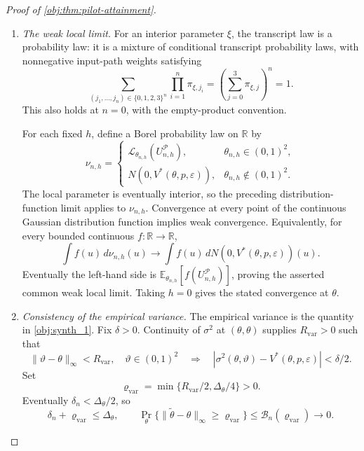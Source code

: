 \begin{proof}[Proof of \cref{obj:thm:pilot-attainment}]
\begin{enumerate}
Both distribution functions lie in \([0,1]\). Splitting the pilot average into the displayed neighborhood and its complement therefore gives, eventually,
\[
\left|
\sum_{\mathbf r}w_{n,h}(\mathbf r)
\mathcal C_{n,h}(x;\vartheta_n(\mathbf r))
-\mathcal G_\theta(x)
\right|
\le a+\mathcal B_n(\beta_n).
\]
Letting \(n\to\infty\), then \(a\downarrow0\), proves
\[
\Pr_{\theta_{n,h}}\{U_{n,h}^{\mathcal P}\le x\}
\longrightarrow\mathcal G_\theta(x)
\qquad(h\in\mathbb R^2,\ x\in\mathbb R).
\]

\item \emph{The weak local limit.}
For an interior parameter \(\xi\), the transcript law is a probability law: it is a mixture of conditional transcript probability laws, with nonnegative input-path weights satisfying
\[
\sum_{(j_1,\ldots,j_n)\in\{0,1,2,3\}^n}
\prod_{i=1}^n\pi_{\xi,j_i}
=\left(\sum_{j=0}^3\pi_{\xi,j}\right)^n=1.
\]
This also holds at \(n=0\), with the empty-product convention.

For each fixed \(h\), define a Borel probability law on \(\mathbb R\) by
\[
\nu_{n,h}=
\begin{cases}
\mathcal L_{\theta_{n,h}}(U_{n,h}^{\mathcal P}),
&\theta_{n,h}\in(0,1)^2,\\
N(0,V^*(\theta,p,\varepsilon)),
&\theta_{n,h}\notin(0,1)^2.
\end{cases}
\]
The local parameter is eventually interior, so the preceding distribution-function limit applies to \(\nu_{n,h}\). Convergence at every point of the continuous Gaussian distribution function implies weak convergence. Equivalently, for every bounded continuous \(f:\mathbb R\to\mathbb R\),
\[
\int f(u)\,d\nu_{n,h}(u)
\longrightarrow
\int f(u)\,dN(0,V^*(\theta,p,\varepsilon))(u).
\]
Eventually the left-hand side is
\(\mathbb E_{\theta_{n,h}}[f(U_{n,h}^{\mathcal P})]\), proving the asserted common weak local limit. Taking \(h=0\) gives the stated convergence at \(\theta\).

\item \emph{Consistency of the empirical variance.}
The empirical variance is the quantity in \cref{obj:synth_1}. Fix \(\delta>0\). Continuity of \(\sigma^2\) at \((\theta,\theta)\) supplies \(R_{\mathrm{var}}>0\) such that
\[
\|\vartheta-\theta\|_\infty<R_{\mathrm{var}},
\quad \vartheta\in(0,1)^2
\quad\Longrightarrow\quad
|\sigma^2(\theta,\vartheta)-V^*(\theta,p,\varepsilon)|<\delta/2.
\]
Set
\[
\varrho_{\mathrm{var}}
=\min\{R_{\mathrm{var}}/2,\Delta_\theta/4\}>0.
\]
Eventually \(\delta_n<\Delta_\theta/2\), so
\[
\delta_n+\varrho_{\mathrm{var}}\le\Delta_\theta,
\qquad
\Pr_\theta\{\|\widetilde\theta-\theta\|_\infty
\ge\varrho_{\mathrm{var}}\}
\le\mathcal B_n(\varrho_{\mathrm{var}})\longrightarrow0.
\]


\end{enumerate}
\end{proof}
